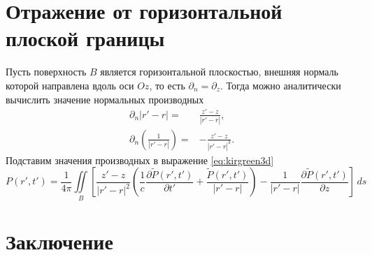 \documentclass[a4paper, fontsize=14pt]{article}
\begin{document}
	\section{Отражение от горизонтальной плоской границы}
		Пусть поверхность $B$ является горизонтальной плоскостью, внешняя нормаль которой направлена вдоль оси $Oz$, то есть $\partial_n = \partial_z$. Тогда можно аналитически вычислить значение нормальных производных
		\begin{eqnarray}
			\partial_n|r'-r| =& \frac{z' - z}{|r' - r|}, \\ 
			\partial_n\left(\frac{1}{|r'-r|}\right) =& -  \frac{z' - z}{|r' - r|^3}.
		\end{eqnarray} 
		Подставим значения производных в выражение \ref{eq:kirgreen3d}
		\begin{equation}
			P(r',t') = \frac{1}{4\pi} \iint\limits_B
			\left[\frac{z'-z}{|r'-r|^2}\left(\frac{1}{c}\frac{\partial\tilde{P}(r',t')}{\partial t'}+\frac{\tilde{P}(r',t')}{|r'-r|}\right) - \frac{1}{|r'-r|}\frac{\partial\tilde{P}(r',t')}{\partial z}\right]\,ds
		\end{equation}
	\clearpage
	
	
	\section*{Заключение} 
	
	\newpage
	
	
	\printbibliography
	
	\newpage
	
	
\end{document}
